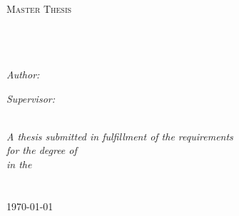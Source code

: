 \documentclass[11pt, oneside]{Thesis} %
\begin{document}
\begin{titlepage}
\begin{center}
\textsc{\LARGE \univname}\\[1.5cm] %
\textsc{\Large Master Thesis}\\[0.5cm] %

\HRule \\[0.4cm] %
{\huge \bfseries \ttitle}\\[0.4cm] %
\HRule \\[1.5cm] %
 
\begin{minipage}{0.4\textwidth}
\begin{flushleft} \large
\emph{Author:}\\
\href{http://www.johnsmith.com}{\authornames} %
\end{flushleft}
\end{minipage}
\begin{minipage}{0.4\textwidth}
\begin{flushright} \large
\emph{Supervisor:} \\
\href{http://soa.cmu.edu/nina-baird/}{\supname} %
\end{flushright}
\end{minipage}\\[3cm]
 
\large \textit{A thesis submitted in fulfillment of the requirements\\ for the degree of \degreename}\\[0.3cm] %
\textit{in the}\\[0.4cm]
\groupname\\\deptname\\[2cm] %
 
{\large \today}\\[4cm] %
 
\vfill
\end{center}

\end{titlepage}

\end{document}
